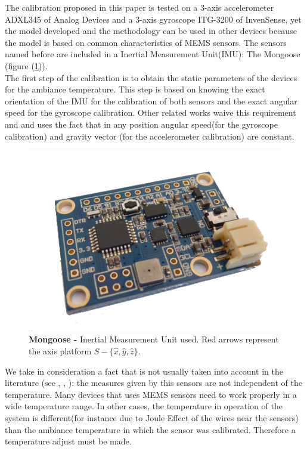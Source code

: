 \documentclass[conference]{IEEEtran}
\newcommand{\refp}[1]{(\ref{#1})}
\begin{document}
The calibration proposed in this paper is tested on a 3-axis accelerometer ADXL345 of Analog Devices and a 3-axis gyroscope ITG-3200  of InvenSense, yet the model developed and the methodology can be used in other devices because the model is based on common characteristics of MEMS sensors. The sensors named before are included in a Inertial Measurement Unit(IMU): The Mongoose (figure \refp{fig:mongoose}). \\


The first step of the calibration is to obtain the static parameters of the devices for the ambiance temperature. This step is based on knowing the exact orientation of the IMU for the calibration of both sensors and the exact angular speed for the gyroscope calibration. Other related works waive this requirement\cite{bib:calib_imu} and \cite{bib:kalman} and uses the fact that in any position angular speed(for the gyroscope calibration) and gravity vector (for the accelerometer calibration) are constant.\\

\begin{figure}[h]
	\centering
	\includegraphics[width=.6\columnwidth]{./pics_paper/mongoose.png}
	\caption{\textbf{Mongoose -} Inertial Measurement Unit used. Red arrows represent the axis platform $S - \{\hat{x}, \hat{y}, \hat{z} \}$. }
	\label{fig:mongoose}
\end{figure}

We take in consideration a fact that is not usually taken into account in the literature (see \cite{bib:calib_imu}, \cite{bib:kalman}, \cite{bib:calib_imu_dos}): the measures given by this sensors are not independent of the temperature. Many devices that uses MEMS sensors need to work properly in a wide temperature range. In other cases, the temperature in operation of the system is different(for instance due to Joule Effect of the wires near the sensors) than the ambiance temperature in which the sensor was calibrated. Therefore a temperature adjust must be made.
   
\end{document}
